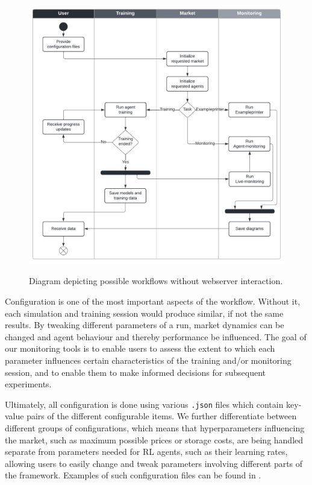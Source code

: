 \begin{figure}[t]
	\centering
	\includegraphics[width = \textwidth]{images/workflow_swimlanes.pdf}\\
	\caption{Diagram depicting possible workflows without webserver interaction.}\label{fig:WorkflowSwimlanes}
\end{figure}

Configuration is one of the most important aspects of the workflow. Without it, each simulation and training session would produce similar, if not the same results. By tweaking different parameters of a run, market dynamics can be changed and agent behaviour and thereby performance be influenced. The goal of our monitoring tools is to enable users to assess the extent to which each parameter influences certain characteristics of the training and/or monitoring session, and to enable them to make informed decisions for subsequent experiments.

Ultimately, all configuration is done using various \texttt{.json} files which contain key-value pairs of the different configurable items. We further differentiate between different groups of configurations, which means that hyperparameters influencing the market, such as maximum possible prices or storage costs, are being handled separate from parameters needed for RL agents, such as their learning rates, allowing users to easily change and tweak parameters involving different parts of the framework. Examples of such configuration files can be found in .

